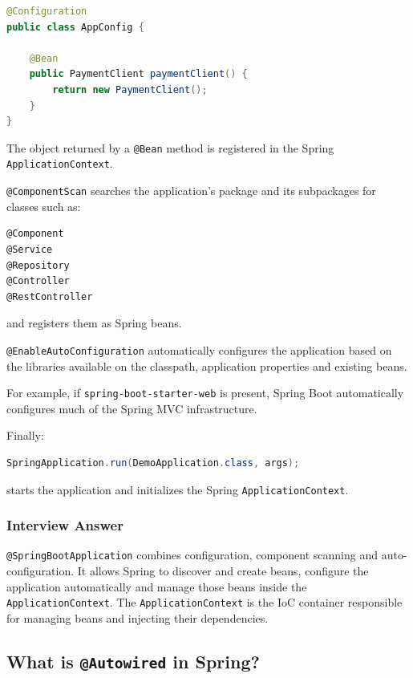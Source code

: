 \documentclass[12pt,a4paper]{article}
\begin{document}
\begin{lstlisting}[language=Java]
@Configuration
public class AppConfig {

    @Bean
    public PaymentClient paymentClient() {
        return new PaymentClient();
    }
}
\end{lstlisting}

The object returned by a \texttt{@Bean} method is registered in the
Spring \texttt{ApplicationContext}.

\texttt{@ComponentScan} searches the application's package and its
subpackages for classes such as:

\begin{verbatim}
@Component
@Service
@Repository
@Controller
@RestController
\end{verbatim}

and registers them as Spring beans.

\texttt{@EnableAutoConfiguration} automatically configures the application
based on the libraries available on the classpath, application properties
and existing beans.

For example, if \texttt{spring-boot-starter-web} is present, Spring Boot
automatically configures much of the Spring MVC infrastructure.

Finally:

\begin{lstlisting}[language=Java]
SpringApplication.run(DemoApplication.class, args);
\end{lstlisting}

starts the application and initializes the Spring
\texttt{ApplicationContext}.

\subsubsection*{Interview Answer}

\texttt{@SpringBootApplication} combines configuration, component scanning
and auto-configuration. It allows Spring to discover and create beans,
configure the application automatically and manage those beans inside the
\texttt{ApplicationContext}. The \texttt{ApplicationContext} is the IoC
container responsible for managing beans and injecting their dependencies.

\subsection{What is \texttt{@Autowired} in Spring?}
\end{document}

